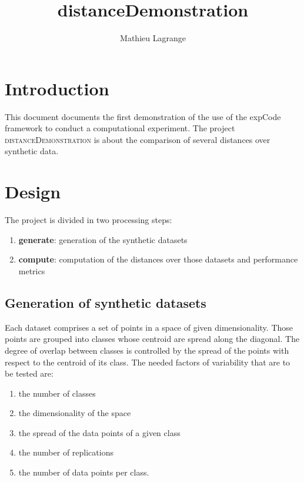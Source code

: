 \documentclass[10pt,a4paper,fleqn]{article}
\title{distanceDemonstration}
\author{ Mathieu Lagrange }
\begin{document}
 
  
\maketitle 
  

\section{Introduction}

This document documents the first demonstration of the use of the expCode framework to conduct a computational experiment. The project \textsc{distanceDemonstration} is about the comparison of several distances over synthetic data.

\section{Design}

 The project is divided in two processing steps:
\begin{enumerate}
\item \textbf{generate}: generation of the synthetic datasets
\item \textbf{compute}: computation of the distances over those datasets and performance metrics
\end{enumerate}

\subsection{Generation of synthetic datasets}

Each dataset comprises a set of points in a space of given dimensionality. Those points are grouped into classes whose centroid are spread along the diagonal. The degree of overlap between classes is controlled by the spread of the points with respect to the centroid of its class. The needed factors of variability that are to be tested are:
\begin{enumerate}
\item the number of classes
\item the dimensionality of the space
\item the spread of the data points of a given class
\item the number of replications
\item the number of data points per class.
\end{enumerate}
\end{document}
